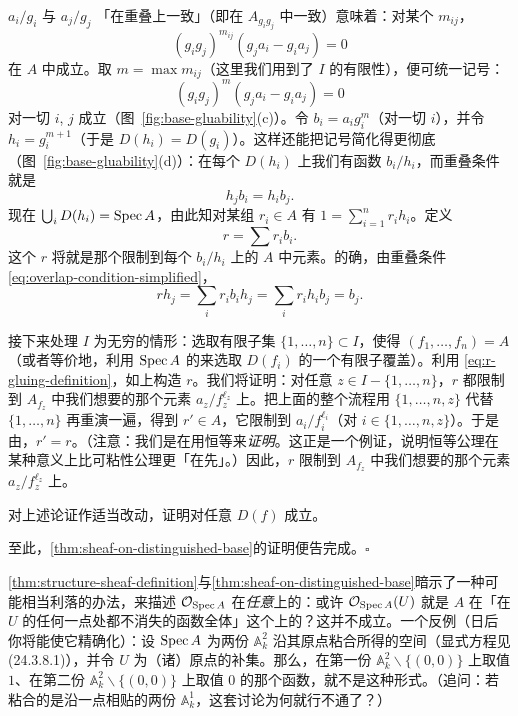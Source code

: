 $a_i/g_i$ 与 $a_j/g_j$ 「在重叠上一致」（即在 $A_{g_i g_j}$ 中一致）意味着：对某个 $m_{ij}$，
\[
(g_ig_j)^{m_{ij}}(g_ja_i-g_ia_j)=0
\]
在 $A$ 中成立。取 $m=\max m_{ij}$（这里我们用到了 $I$ 的有限性），便可统一记号：
\[
(g_ig_j)^{m}(g_ja_i-g_ia_j)=0
\]
对一切 $i$, $j$ 成立（图~\ref{fig:base-gluability}(c)）。令 $b_i=a_ig_i^{m}$（对一切 $i$），并令 $h_i=g_i^{m+1}$（于是 $D(h_i)=D(g_i)$）。这样还能把记号简化得更彻底（图~\ref{fig:base-gluability}(d)）：在每个 $D(h_i)$ 上我们有函数 $b_i/h_i$，而重叠条件就是
\begin{equation*}\tag{4.1.3.2}\label{eq:overlap-condition-simplified}
h_jb_i=h_ib_j.
\end{equation*}
现在 $\bigcup_i D(h_i)=\operatorname{Spec} A$，由此知对某组 $r_i\in A$ 有 $1=\sum_{i=1}^{n}r_ih_i$。定义
\begin{equation*}\tag{4.1.3.3}\label{eq:r-gluing-definition}
r=\sum r_ib_i.
\end{equation*}
这个 $r$ 将就是那个限制到每个 $b_i/h_i$ 上的 $A$ 中元素。的确，由重叠条件 \eqref{eq:overlap-condition-simplified}，
\[
rh_j=\sum_i r_ib_ih_j=\sum_i r_ih_ib_j=b_j.
\]

接下来处理 $I$ 为无穷的情形：选取有限子集 $\{1,\dots,n\}\subset I$，使得 $(f_1,\dots,f_n)=A$（或者等价地，利用 $\operatorname{Spec} A$ 的\trQuasicompactness{}来选取 $D(f_i)$ 的一个有限子覆盖）。利用 \eqref{eq:r-gluing-definition}，如上构造 $r$。我们将证明：对任意 $z\in I-\{1,\dots,n\}$，$r$ 都限制到 $A_{f_z}$ 中我们想要的那个元素 $a_z/f_z^{\ell_z}$ 上。把上面的整个流程用 $\{1,\dots,n,z\}$ 代替 $\{1,\dots,n\}$ 再重演一遍，得到 $r'\in A$，它限制到 $a_i/f_i^{\ell_i}$（对 $i\in\{1,\dots,n,z\}$）。于是由\trBase\trIdentityAxiom，$r'=r$。（注意：我们是在用\trBase{}恒等来\emph{证明}\trBase\trGluability。这正是一个例证，说明恒等公理在某种意义上比可粘性公理更「在先」。）因此，$r$ 限制到 $A_{f_z}$ 中我们想要的那个元素 $a_z/f_z^{\ell_z}$ 上。

\begin{exercise}\label{ex:base-gluability-distinguished-open}
对上述论证作适当改动，证明\trBase\trGluability{}对任意\trDistinguishedOpen{} $D(f)$ 成立。
\end{exercise}

至此，\cref{thm:sheaf-on-distinguished-base}的证明便告完成。\hfill$\square$

\begin{remark}[\hard\hard]\label{thm:sections-not-localization}
\cref{thm:structure-sheaf-definition}与\cref{thm:sheaf-on-distinguished-base}暗示了一种可能相当利落的办法，来描述 $\mathcal{O}_{\operatorname{Spec} A}$ 在\emph{任意}\trOpenSubset{}上的\trSection：或许 $\mathcal{O}_{\operatorname{Spec} A}(U)$ 就是 $A$ 在「在 $U$ 的任何一点处都不消失的函数全体」这个\trMultiplicativeSubset{}上的\trLocalization？这并不成立。一个反例（日后你将能使它精确化）：设 $\operatorname{Spec} A$ 为两份 $\mathbb{A}^2_k$ 沿其原点粘合所得的空间（显式方程见 (24.3.8.1)），并令 $U$ 为（诸）原点的补集。那么，在第一份 $\mathbb{A}^2_k\smallsetminus\{(0,0)\}$ 上取值 $1$、在第二份 $\mathbb{A}^2_k\smallsetminus\{(0,0)\}$ 上取值 $0$ 的那个函数，就不是这种形式。（追问：若粘合的是沿一点相贴的两份 $\mathbb{A}^1_k$，这套讨论为何就行不通了？）
\end{remark}

